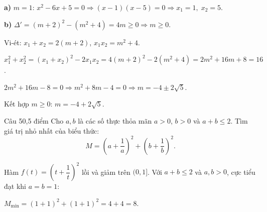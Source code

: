 \begin{loi_giai_cau}
\textbf{a)} $m=1$: $x^2-6x+5=0\Rightarrow(x-1)(x-5)=0\Rightarrow\boxed{x_1=1,\; x_2=5}$.

\textbf{b)} $\Delta'=(m+2)^2-(m^2+4)=4m\ge0\Rightarrow m\ge0$.

Vi-ét: $x_1+x_2=2(m+2)$, $x_1x_2=m^2+4$.

$x_1^2+x_2^2=(x_1+x_2)^2-2x_1x_2=4(m+2)^2-2(m^2+4)=2m^2+16m+8=16$.

$2m^2+16m-8=0\Rightarrow m^2+8m-4=0\Rightarrow m=-4\pm2\sqrt{5}$.

Kết hợp $m\ge0$: $m=\boxed{-4+2\sqrt{5}}$.
\end{loi_giai_cau}

\begin{de_cau}{Câu 5}{0,5 điểm}
Cho $a, b$ là các số thực thỏa mãn $a > 0$, $b > 0$ và $a + b \le 2$. Tìm giá trị nhỏ nhất của biểu thức:
\[M = \left(a+\dfrac{1}{a}\right)^2 + \left(b+\dfrac{1}{b}\right)^2.\]
\end{de_cau}

\begin{loi_giai_cau}
Hàm $f(t)=\left(t+\dfrac{1}{t}\right)^2$ lồi và giảm trên $(0,1]$. Với $a+b\le2$ và $a,b>0$, cực tiểu đạt khi $a=b=1$:

$M_{\min}=\left(1+1\right)^2+\left(1+1\right)^2=4+4=\boxed{8}$.
\end{loi_giai_cau}
